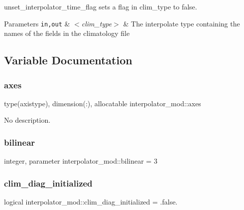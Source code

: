 unset\+\_\+interpolator\+\_\+time\+\_\+flag sets a flag in clim\+\_\+type to false. 


\begin{DoxyParams}[1]{Parameters}
\mbox{\tt in,out}  & {\em $<$clim\+\_\+type$>$} & The interpolate type containing the names of the fields in the climatology file \\
\hline
\end{DoxyParams}


\subsection{Variable Documentation}
\mbox{\label{namespaceinterpolator__mod_aff9153472fc8b4a3382cba78b8c2dc19}} 
\subsubsection{\texorpdfstring{axes}{axes}}
{\footnotesize\ttfamily type(axistype), dimension(\+:), allocatable interpolator\+\_\+mod\+::axes\hspace{0.3cm}{\ttfamily [private]}}



No description. 

\mbox{\label{namespaceinterpolator__mod_a64b64cb9cf29aa6f001fc15e47b3380c}} 
\subsubsection{\texorpdfstring{bilinear}{bilinear}}
{\footnotesize\ttfamily integer, parameter interpolator\+\_\+mod\+::bilinear = 3\hspace{0.3cm}{\ttfamily [private]}}

\mbox{\label{namespaceinterpolator__mod_a7c2831b23ac995cf169be6a48e68d922}} 
\subsubsection{\texorpdfstring{clim\+\_\+diag\+\_\+initialized}{clim\_diag\_initialized}}
{\footnotesize\ttfamily logical interpolator\+\_\+mod\+::clim\+\_\+diag\+\_\+initialized = .false.\hspace{0.3cm}{\ttfamily [private]}}

